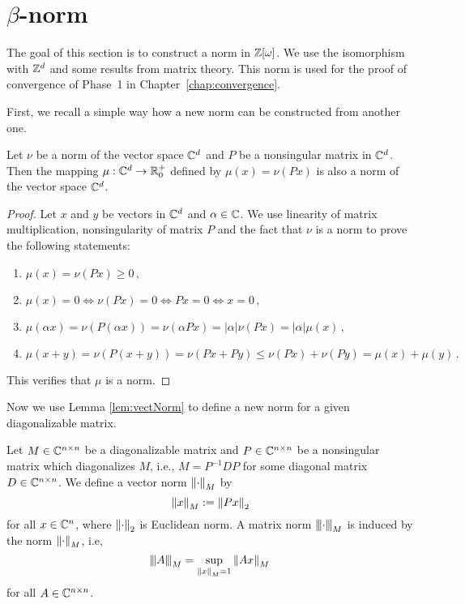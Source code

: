 \section{$\beta$-norm}
The goal of this section is to construct a norm in $\mathbb{Z}[\omega]$. We use the isomorphism with $\mathbb{Z}^d$ and some results from matrix theory. This norm is used for the proof of convergence of Phase~1 in Chapter~\ref{chap:convergence}.

First, we recall a simple way how a new norm can be constructed from another one.

\begin{lem}
\label{lem:vectNorm}
Let $\nu$ be a norm of the vector space $\mathbb{C}^d$ and $P$ be a nonsingular matrix in $\mathbb{C}^d$. Then the mapping $\mu:\mathbb{C}^d\rightarrow \mathbb{R}^+_0$ defined by $\mu(x)=\nu(Px)$ is also a norm of the vector space $\mathbb{C}^d$.
\end{lem}
\begin{proof}
Let $x$ and $y$ be vectors in $\mathbb{C}^d$ and $\alpha\in \mathbb{C}$.  We use linearity of matrix multiplication, nonsingularity of matrix $P$ and the fact that $\nu$ is a norm to prove the following statements:
\begin{enumerate}
    \item $\mu(x)=\nu(Px)\geq 0\,,$
    \item $\mu(x)=0 \iff \nu(Px)=0 \iff Px=0 \iff x=0\,,$
    \item $\mu(\alpha x)=\nu(P(\alpha x))=\nu(\alpha Px)=|\alpha|\nu(Px)=|\alpha|\mu(x)\,,$
    \item $\mu(x+y)=\nu(P(x+y))=\nu(Px+Py)\leq \nu(Px)+\nu(Py)=\mu(x)+\mu(y)\,.$
\end{enumerate}
This  verifies that $\mu$ is a norm.
\end{proof}


Now we use Lemma \ref{lem:vectNorm} to define a new norm for a given diagonalizable matrix.
\begin{defn}
\label{def:newNorm}
Let $M\in\mathbb{C}^{n\times n}$ be a diagonalizable matrix and $P\in\mathbb{C}^{n\times n}$ be a nonsingular matrix which diagonalizes $M$, i.e., $M=P^{-1}DP$ for some diagonal matrix $D\in\mathbb{C}^{n\times n}$. We define a vector norm $\left\lVert\cdot\right\rVert_{M}$ by  
\begin{equation}
\left\lVert x\right\rVert_{M}:=\left\lVert Px\right\rVert_{2}
\end{equation}
for all $x\in\mathbb{C}^n$, where $\left\lVert\cdot\right\rVert_{2}$ is Euclidean norm. A matrix norm ${\left\vert\kern-0.25ex\left\vert\kern-0.25ex\left\vert \cdot\right\vert\kern-0.25ex\right\vert\kern-0.25ex\right\vert}_{M}$ is induced by the norm $\left\lVert\cdot\right\rVert_{M}$, i.e, 
$$
{\left\vert\kern-0.25ex\left\vert\kern-0.25ex\left\vert A\right\vert\kern-0.25ex\right\vert\kern-0.25ex\right\vert}_{M}=\sup_{\left\lVert x\right\rVert_{M}=1} \left\lVert Ax\right\rVert_{M}\,
$$
for all $A\in\mathbb{C}^{n\times n}$.
\end{defn}

